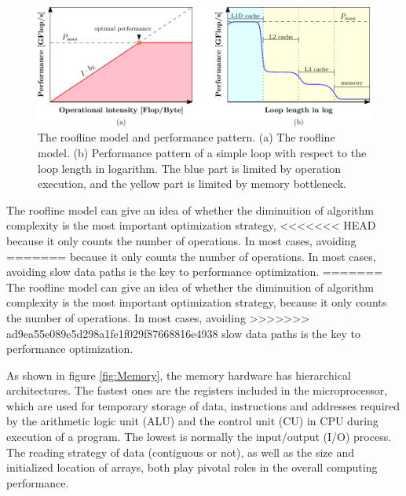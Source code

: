 \begin{figure}[h]
\begin{centering}
\includegraphics[width=1\columnwidth]{_figure/roofline}
\par\end{centering}

\caption[The roofline model and performance pattern]{The roofline model and performance pattern. (a) The roofline model.
(b) Performance pattern of a simple loop with respect to the loop
length in logarithm. The blue part is limited by operation execution,
and the yellow part is limited by memory bottleneck. \label{fig:The-roofline-model}}
\end{figure}


The roofline model can give an idea of whether the diminuition of
algorithm complexity is the most important optimization strategy,
<<<<<<< HEAD
because it only counts the number of operations. In most cases, avoiding
=======
because it only counts the number of operations. In most cases,
avoiding slow data paths is the key to performance optimization.
=======
The roofline model can give an idea of whether the diminuition of algorithm
complexity is the most important optimization strategy, because it
only counts the number of operations. In most cases, avoiding
>>>>>>> ad9ea55e089e5d298a1fe1f029f87668816e4938
slow data paths is the key to performance optimization.

As shown in figure \ref{fig:Memory}, the memory hardware has hierarchical
architectures. The fastest ones are the registers included in the
microprocessor, which are used for temporary storage of data, instructions
and addresses required by the arithmetic logic unit (ALU) and the
control unit (CU) in CPU during execution of a program. The lowest
is normally the input/output (I/O) process. The reading strategy of
data (contiguous or not), as well as the size and initialized location
of arrays, both play pivotal roles in the overall computing performance.

